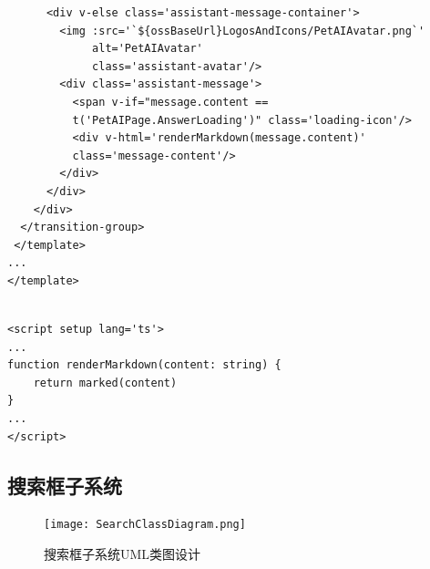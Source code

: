 \begin{itemize}
\begin{verbatim}
      <div v-else class='assistant-message-container'>
        <img :src='`${ossBaseUrl}LogosAndIcons/PetAIAvatar.png`'
             alt='PetAIAvatar'
             class='assistant-avatar'/>
        <div class='assistant-message'>
          <span v-if="message.content == 
          t('PetAIPage.AnswerLoading')" class='loading-icon'/>
          <div v-html='renderMarkdown(message.content)' 
          class='message-content'/>
        </div>
      </div>
    </div>
  </transition-group>
 </template>
...
</template>
		
	\end{verbatim}
	
	\begin{verbatim}
<script setup lang='ts'>
...
function renderMarkdown(content: string) {
	return marked(content)
}
...
</script>
	\end{verbatim}
\end{itemize}

\subsection{搜索框子系统}

\begin{figure}[H]
	\centering
	\texttt{[image: SearchClassDiagram.png]}
	\caption{搜索框子系统UML类图设计}
\end{figure}

